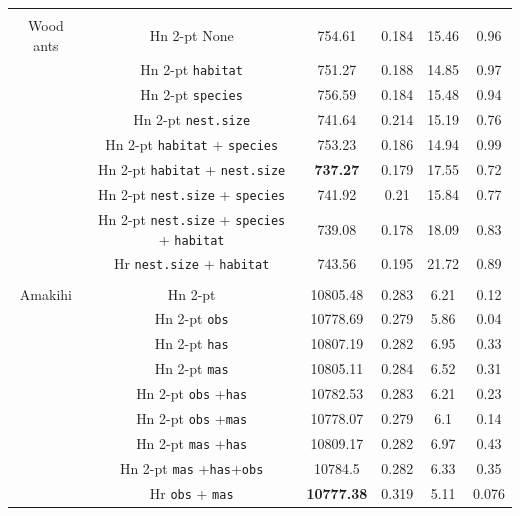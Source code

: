 \documentclass[useAMS,referee,usenatbib]{biom}
\begin{document}
\begin{table}
\begin{tabular}{c c c c c c}
 &&&&&\\
Wood ants & Hn 2-pt  None  &  754.61  &  0.184  &  15.46  &  0.96 \\
 & Hn 2-pt \texttt{habitat} &  751.27  &  0.188  &  14.85  &  0.97 \\
 & Hn 2-pt \texttt{species} &  756.59  &  0.184  &  15.48  &  0.94 \\
 & Hn 2-pt \texttt{nest.size} &  741.64  &  0.214  &  15.19  &  0.76 \\
 & Hn 2-pt \texttt{habitat} + \texttt{species} &  753.23  &  0.186  &  14.94  &  0.99 \\
 & Hn 2-pt \texttt{habitat} + \texttt{nest.size}  &  \textbf{737.27}  &  0.179  &  17.55  &  0.72 \\
 & Hn 2-pt \texttt{nest.size} + \texttt{species}   &  741.92  &  0.21  &  15.84  &  0.77 \\
 & Hn 2-pt \texttt{nest.size} + \texttt{species} + \texttt{habitat}  &  739.08  &  0.178  &  18.09  &  0.83 \\
 & Hr \texttt{nest.size} + \texttt{habitat} & 743.56 & 0.195  & 21.72 & 0.89\\ %
 &&&&&\\
Amakihi & Hn 2-pt &  10805.48  &  0.283  &  6.21  &  0.12 \\
 & Hn 2-pt \texttt{obs} &  10778.69  &  0.279  &  5.86  &  0.04 \\
 & Hn 2-pt \texttt{has}  &  10807.19  &  0.282  &  6.95  &  0.33 \\
 & Hn 2-pt \texttt{mas}  &  10805.11  &  0.284  &  6.52  &  0.31 \\
 & Hn 2-pt \texttt{obs} +\texttt{has}  &  10782.53  &  0.283  &  6.21  &  0.23 \\
 & Hn 2-pt \texttt{obs} +\texttt{mas}  &  10778.07  &  0.279  &  6.1  &  0.14 \\
 & Hn 2-pt \texttt{mas} +\texttt{has}  &  10809.17  &  0.282  &  6.97  &  0.43 \\
 & Hn 2-pt \texttt{mas} +\texttt{has}+\texttt{obs}  &  10784.5  &  0.282  &  6.33  &  0.35 \\
 & Hr \texttt{obs} + \texttt{mas} & \textbf{10777.38} &  0.319 & 5.11 & 0.076\\ %
\hline
\end{tabular}
\label{williams-pike-table}
\end{table}
\end{document}

